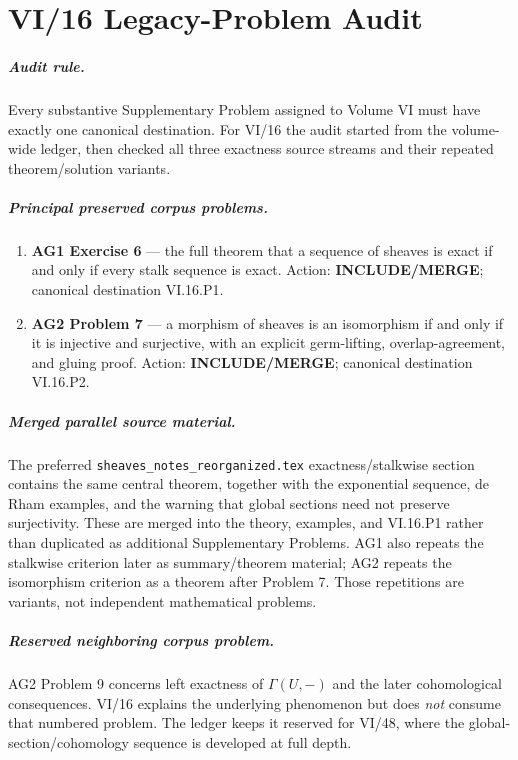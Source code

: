\chapter*{VI/16 Legacy-Problem Audit}

\paragraph{Audit rule.}
Every substantive Supplementary Problem assigned to Volume VI must have exactly one canonical
destination.  For VI/16 the audit started from the volume-wide ledger, then checked all three
exactness source streams and their repeated theorem/solution variants.

\paragraph{Principal preserved corpus problems.}
\begin{enumerate}
\item \textbf{AG1 Exercise 6} --- the full theorem that a sequence of sheaves is exact if and
only if every stalk sequence is exact.  Action: \textbf{INCLUDE/MERGE}; canonical destination
VI.16.P1.
\item \textbf{AG2 Problem 7} --- a morphism of sheaves is an isomorphism if and only if it is
injective and surjective, with an explicit germ-lifting, overlap-agreement, and gluing proof.
Action: \textbf{INCLUDE/MERGE}; canonical destination VI.16.P2.
\end{enumerate}

\paragraph{Merged parallel source material.}
The preferred \texttt{sheaves\_notes\_reorganized.tex} exactness/stalkwise section contains the
same central theorem, together with the exponential sequence, de Rham examples, and the warning
that global sections need not preserve surjectivity.  These are merged into the theory, examples,
and VI.16.P1 rather than duplicated as additional Supplementary Problems.  AG1 also repeats the
stalkwise criterion later as summary/theorem material; AG2 repeats the isomorphism criterion as a
theorem after Problem 7.  Those repetitions are variants, not independent mathematical problems.

\paragraph{Reserved neighboring corpus problem.}
AG2 Problem 9 concerns left exactness of $\Gamma(U,-)$ and the later cohomological consequences.
VI/16 explains the underlying phenomenon but does \emph{not} consume that numbered problem.  The
ledger keeps it reserved for VI/48, where the global-section/cohomology sequence is developed at
full depth.

